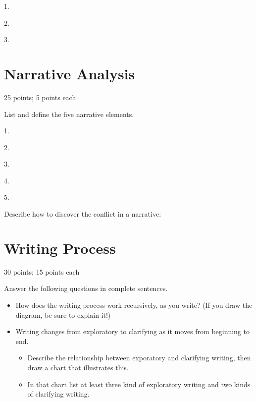 \documentclass[11pt]{article}
\begin{document}
\vspace{0.5cm}


1.
\vspace{1.5cm}

2.
\vspace{1.5cm}

3.
\vspace{1.5cm}


\section{Narrative Analysis}
\label{sec:org74bc1ce}
25 points; 5 points each
\vspace{1em}

List and define the five narrative elements. 

\vspace{1em}

1.
\vspace{1.0cm}

2.
\vspace{1.0cm}

3.
\vspace{1.0cm}

4.
\vspace{1.0cm}

5.
\vspace{1.0cm}

Describe how to discover the conflict in a narrative:
\vspace{2.5cm}

\newpage
\section{Writing Process}
\label{sec:orga226362}
30 points; 15 points each
\vspace{1em}

Answer the following questions in complete sentences.
\begin{itemize}
\item How does the writing process work recursively, as you write? (If you
draw the diagram, be sure to explain it!) \vspace{6cm}
\item Writing changes from exploratory to clarifying as it moves from
beginning to end.
\begin{itemize}
\item Describe the relationship between exporatory and clarifying
  writing, then draw a chart that illustrates this.
\item In that chart list at least three kind of exploratory writing
and two kinds of clarifying writing.
\end{itemize}\vspace{8cm}
\end{itemize}
\end{document}
